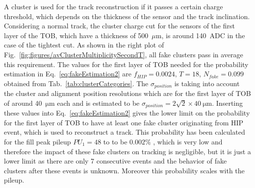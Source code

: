 \begin{table}
\begin{center}
\caption[Table caption text]{The average cluster charge, multiplicity and width for the four categories defined in Table~\ref{tab:eventCategories} for the run 281604. These quantities are computed from both on-track and off-track clusters.}
\label{tab:clusterCategories}
\end{center}
\end{table}

A cluster is used for the track reconstruction if it passes a certain charge threshold, which depends on the thickness of the sensor and the track inclination. Considering a normal track, the cluster charge cut for the sensors of the first layer of the TOB, which have a thickness of 500~$\mu$m, is around 140~ADC in the case of the tightest cut. As shown in the right plot of Fig.~\ref{fig:figures/avClusterMultiplicitySecondT}, all fake clusters pass in average this requirement. The values for the first layer of TOB needed for the probability estimation in Eq.~\ref{eq:fakeEstimation2} are $f_{HIP} = 0.0024$, $T = 18$, $N_{fake} =0.099$ obtained from Tab.~\ref{tab:clusterCategories}. The $\sigma_{position}$ is taking into account the cluster and alignment position resolutions which are for the first layer of TOB of around 40~$\mathrm{\mu m}$ each and is estimated to be $\sigma_{position} = 2 \sqrt{2} \times 40 ~\mathrm{\mu m}$. Inserting these values into Eq.~\ref{eq:fakeEstimation2} gives the lower limit on the probability for the first layer of TOB to have at least one fake cluster originating from HIP event,  which is used to reconstruct a track. This probability has been calculated for the fill peak pileup $PU_{1} = 48$ to to be $0.002\%$ , which is very low and therefore the impact of these fake clusters on tracking is negligible, but it is just a lower limit as there are only 7 consecutive events and the behavior of fake clusters after these events is unknown. Moreover this probability scales with the pileup. %

